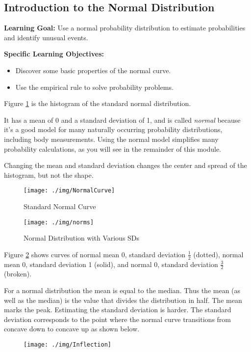 \cleardoublepage
\subsection{Introduction to the Normal Distribution}
\textbf{Learning Goal:} Use a normal probability distribution to estimate probabilities and identify unusual events.

\textbf{Specific Learning Objectives:} 
\begin{itemize}
\item Discover some basic properties of the normal curve.
\item Use the empirical rule to solve probability problems.
\end{itemize}

Figure \ref{fig:nzeroone} is the histogram of the standard normal distribution. 

It has a mean of 0 and a standard deviation of 1, and is called \emph{normal} because it's a good model for many naturally occurring probability distributions, including body measurements. Using the normal model simplifies many probability calculations, as you will see in the remainder of this module.
 
Changing the mean and standard deviation changes the center and spread of the histogram, but not the shape. 

\begin{figure}[h]
\centering{}\texttt{[image: ./img/NormalCurve]} \caption{Standard Normal Curve}
\label{fig:nzeroone}
\end{figure}


\begin{figure}[h]
\centering \texttt{[image: ./img/norms]} \caption{Normal Distribution with Various SDs}
\label{fig:normSDs}
\end{figure}
Figure \ref{fig:normSDs} shows curves of normal mean 0, standard deviation $\frac{1}{2}$ (dotted), normal mean 0, standard deviation 1 (solid), and normal 0, standard deviation $\frac{3}{2}$ (broken).

For a normal distribution the mean is equal to the median.  Thus the mean (as well as the median) is the value that divides the distribution in half. The mean marks the peak. 
\newpage
Estimating the standard deviation is harder. The standard deviation corresponds to the point where the normal curve transitions from concave down to concave up as shown below.
\begin{figure}[h]
\centering \texttt{[image: ./img/Inflection]}\end{figure}

